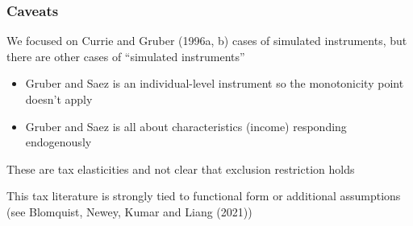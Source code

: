 \documentclass[notes,11pt, aspectratio=169]{beamer}
\newenvironment{wideitemize}{\itemize\addtolength{\itemsep}{10pt}}{\enditemize}
\begin{document}
\begin{frame}
\frametitle{Caveats}

\begin{wideitemize}
\item   We focused on Currie and Gruber (1996a, b) cases of simulated instruments, but there are other cases of ``simulated instruments'' 
\begin{itemize}
\item Gruber and Saez is an individual-level instrument so the monotonicity point doesn't apply
\item Gruber and Saez is all about characteristics (income) responding endogenously
\end{itemize}
\item These are tax elasticities and not clear that exclusion restriction holds
\item This tax literature is strongly tied to functional form or additional assumptions (see Blomquist, Newey, Kumar and Liang (2021))
\end{wideitemize}
\end{frame}
\end{document}
